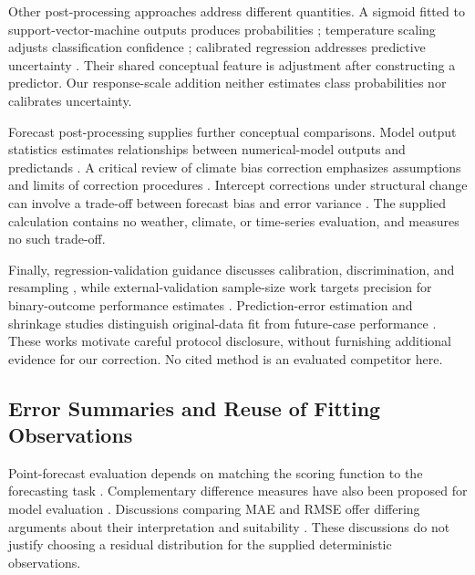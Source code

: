 \documentclass[11pt]{article}
\begin{document}
Other post-processing approaches address different quantities. A sigmoid fitted to support-vector-machine outputs produces probabilities \cite{Platt1999ProbabilisticOutputs}; temperature scaling adjusts classification confidence \cite{Guo2017CalibrationModern}; calibrated regression addresses predictive uncertainty \cite{Kuleshov2018AccurateUncertainties}. Their shared conceptual feature is adjustment after constructing a predictor. Our response-scale addition neither estimates class probabilities nor calibrates uncertainty.

Forecast post-processing supplies further conceptual comparisons. Model output statistics estimates relationships between numerical-model outputs and predictands \cite{Glahn1972UseModel}. A critical review of climate bias correction emphasizes assumptions and limits of correction procedures \cite{Maraun2016BiasCorrecting}. Intercept corrections under structural change can involve a trade-off between forecast bias and error variance \cite{Clements1996InterceptCorrections}. The supplied calculation contains no weather, climate, or time-series evaluation, and measures no such trade-off.

Finally, regression-validation guidance discusses calibration, discrimination, and resampling \cite{Harrell1996MultivariablePrognostic}, while external-validation sample-size work targets precision for binary-outcome performance estimates \cite{Riley2021MinimumSample}. Prediction-error estimation and shrinkage studies distinguish original-data fit from future-case performance \cite{Efron1983EstimatingError,Copas1983RegressionPrediction}. These works motivate careful protocol disclosure, without furnishing additional evidence for our correction. No cited method is an evaluated competitor here.

\subsection{Error Summaries and Reuse of Fitting Observations}

Point-forecast evaluation depends on matching the scoring function to the forecasting task \cite{Gneiting2011MakingEvaluating}. Complementary difference measures have also been proposed for model evaluation \cite{Willmott1985StatisticsEvaluation}. Discussions comparing MAE and RMSE offer differing arguments about their interpretation and suitability \cite{Willmott2005AdvantagesMean,Chai2014RootMean,Hodson2022RootmeansquareError}. These discussions do not justify choosing a residual distribution for the supplied deterministic observations.
\end{document}

